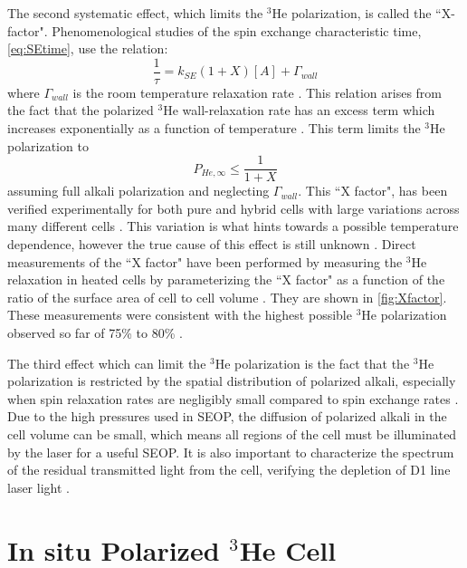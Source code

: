 The second systematic effect, which limits the $^3$He polarization, is called the ``X-factor". Phenomenological studies of the spin exchange characteristic time, \cref{eq:SEtime}, use the relation:
\begin{equation}
    \frac{1}{\tau} = k_{SE} (1 + X) [A] + \Gamma_{wall}
\end{equation}
where $\Gamma_{wall}$ is the room temperature relaxation rate \cite{Chann2002a, Chann2003, Babcock2006, Chen2007, Walker2011, Chen2014, Singh2015}. This relation arises from the fact that the polarized $^3$He wall-relaxation rate has an excess term which increases exponentially as a function of temperature \cite{ Chann2003, Babcock2006, Walker2011, Chen2014, Singh2015}. This term limits the $^3$He polarization to
\begin{equation}
    P_{He, \infty} \le \frac{1}{1+X}
\end{equation}
assuming full alkali polarization and neglecting $\Gamma_{wall}$. This ``X factor", has been verified experimentally for both pure and hybrid cells with large variations across many different cells \cite{Chann2002a, Chann2003, Babcock2006, Chen2007, Walker2011, Chen2014, Singh2015}. This variation is what hints towards a possible temperature dependence, however the true cause of this effect is still unknown \cite{Chann2002a, Chann2003, Babcock2006, Chen2007, Walker2011, Chen2014, Singh2015}. Direct measurements of the ``X factor" have been performed by measuring the $^3$He relaxation in heated cells by parameterizing the ``X factor" as a function of the ratio of the surface area of cell to cell volume \cite{Babcock2006}. They are shown in \cref{fig:Xfactor}. These measurements were consistent with the highest possible $^3$He polarization observed so far of 75\% to 80\% \cite{Parnell2009, Ye2010, Singh2015}.

The third effect which can limit the $^3$He polarization is the fact that the $^3$He polarization is restricted by the spatial distribution of polarized alkali, especially when spin relaxation rates are negligibly small compared to spin exchange rates \cite{Gentile2017, Anderson2020}. Due to the high pressures used in SEOP, the diffusion of polarized alkali in the cell volume can be small, which means all regions of the cell must be illuminated by the laser for a useful SEOP. It is also important to characterize the spectrum of the residual transmitted light from the cell, verifying the depletion of D1 line laser light \cite{Lancor2011}.

\section{In situ Polarized $^{3}$He Cell}

